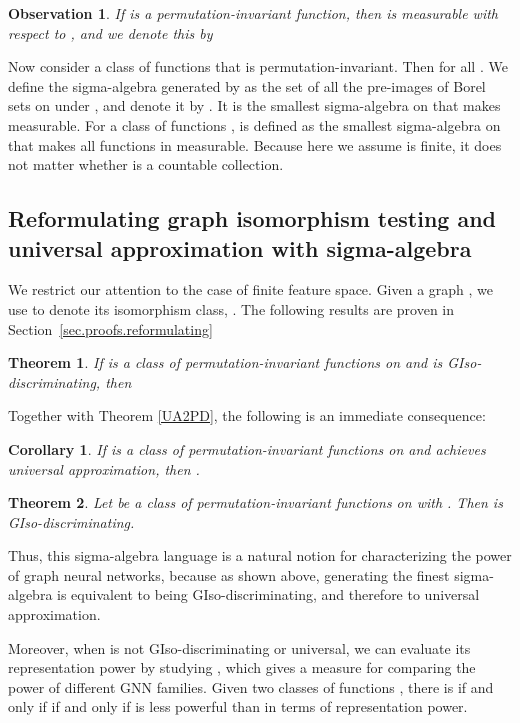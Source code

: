 \documentclass{article}
\newtheorem{theorem}{Theorem}
\newtheorem{observation}{Observation}
\newtheorem{corollary}{Corollary}
\begin{document}
\begin{observation}
If  is a permutation-invariant function, then  is measurable with respect to , and we denote this by 
\end{observation}

Now consider a class of functions  that is permutation-invariant. Then for all . We define the sigma-algebra generated by  as the set of all the pre-images of Borel sets on  under , and denote it by . It is the smallest sigma-algebra on  that makes  measurable. For a class of functions ,  is defined as the smallest sigma-algebra on  that makes all functions in  measurable. Because here we assume  is finite, it does not matter whether  is a countable collection.



\subsection{Reformulating graph isomorphism testing and universal approximation with sigma-algebra}
\label{sec.reformulating}

We restrict our attention to the case of finite feature space. Given a graph , we use  to denote its isomorphism class, . The following results are proven in Section~\ref{sec.proofs.reformulating}

\begin{theorem}\label{teo5}
If  is a class of permutation-invariant functions on  and  is GIso-discriminating, then 
\end{theorem}


Together with Theorem \ref{UA2PD}, the following is an immediate consequence:

\begin{corollary}
If  is a class of permutation-invariant functions on  and  achieves universal approximation, then .
\end{corollary}

\begin{theorem} \label{teo6}
Let be  a class of permutation-invariant functions on  with . Then  is GIso-discriminating.
\end{theorem}


Thus, this sigma-algebra language is a natural notion for characterizing the power of graph neural networks, because as shown above, generating the finest sigma-algebra  is equivalent to being GIso-discriminating, and therefore to universal approximation. 

Moreover, when  is not GIso-discriminating or universal, we can evaluate its representation power by studying , which gives a measure for comparing the power of different GNN families. 
Given two classes of functions , there is  if and only if  if and only if  is less powerful than  in terms of representation power. 
\end{document}
